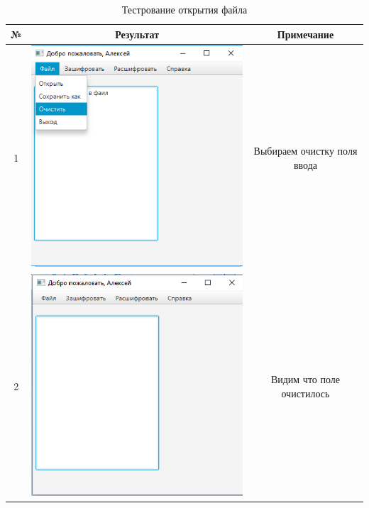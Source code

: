 \documentclass[a4paper,12pt]{article}
\begin{document}
\begin{table}[pt!]
	\caption{Тестрование открытия файла}
	\centering
	\begin{tabular}{|c|c|c|}
	\hline 
	№  & Результат & Примечание \\ 
	\hline 
	1 & \includegraphics[scale=0.3]{img/file/open/text_clear.png} & Выбираем очистку поля ввода \\
	\hline 
	2 & \includegraphics[scale=0.3]{img/file/open/text_clear1.png} & Видим что поле очистилось\\

\end{tabular}
\end{table}
\end{document}
